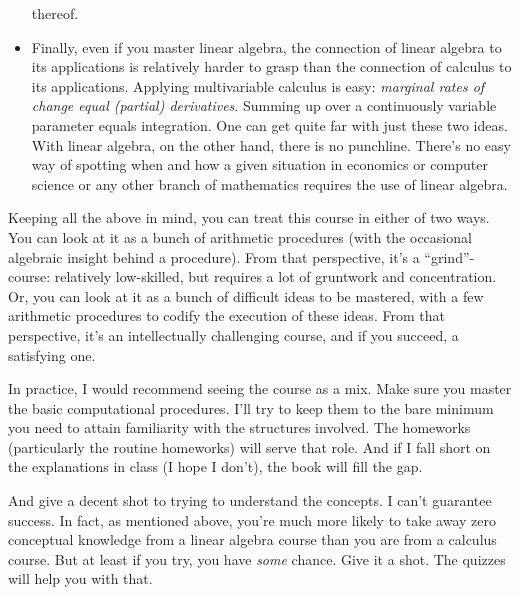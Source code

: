 \documentclass[10pt]{amsart}
\begin{document}
\begin{itemize}
  thereof.
\item Finally, even if you master linear algebra, the connection of
  linear algebra to its applications is relatively harder to grasp
  than the connection of calculus to its applications. Applying
  multivariable calculus is easy: {\em marginal rates of change equal
    (partial) derivatives}. Summing up over a continuously variable
  parameter equals integration. One can get quite far with just these
  two ideas. With linear algebra, on the other hand, there is no
  punchline. There's no easy way of spotting when and how a given
  situation in economics or computer science or any other branch of
  mathematics requires the use of linear algebra.
\end{itemize}

Keeping all the above in mind, you can treat this course in either of
two ways. You can look at it as a bunch of arithmetic procedures (with
the occasional algebraic insight behind a procedure). From that
perspective, it's a ``grind''-course: relatively low-skilled, but
requires a lot of gruntwork and concentration. Or, you can look at it
as a bunch of difficult ideas to be mastered, with a few arithmetic
procedures to codify the execution of these ideas. From that
perspective, it's an intellectually challenging course, and if you
succeed, a satisfying one.

In practice, I would recommend seeing the course as a mix. Make sure
you master the basic computational procedures. I'll try to keep them
to the bare minimum you need to attain familiarity with the structures
involved. The homeworks (particularly the routine homeworks) will
serve that role. And if I fall short on the explanations in class (I
hope I don't), the book will fill the gap.

And give a decent shot to trying to understand the concepts. I can't
guarantee success. In fact, as mentioned above, you're much more
likely to take away zero conceptual knowledge from a linear algebra
course than you are from a calculus course. But at least if you try,
you have {\em some} chance. Give it a shot. The quizzes will help you
with that.
\end{document}
